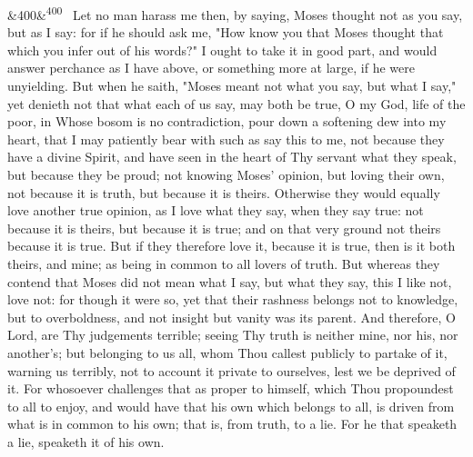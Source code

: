 \documentclass[12pt]{article}
\newcommand{\para}[1][]{\par\noindent\ifx&#1&\else\textsuperscript{\footnotesize #1}~\fi}
\begin{document}
\para[400] Let no man harass me then, by saying, Moses thought not as you say, but as I say: for if he should ask me, "How know you that Moses thought that which you infer out of his words?" I ought to take it in good part, and would answer perchance as I have above, or something more at large, if he were unyielding. But when he saith, "Moses meant not what you say, but what I say," yet denieth not that what each of us say, may both be true, O my God, life of the poor, in Whose bosom is no contradiction, pour down a softening dew into my heart, that I may patiently bear with such as say this to me, not because they have a divine Spirit, and have seen in the heart of Thy servant what they speak, but because they be proud; not knowing Moses' opinion, but loving their own, not because it is truth, but because it is theirs. Otherwise they would equally love another true opinion, as I love what they say, when they say true: not because it is theirs, but because it is true; and on that very ground not theirs because it is true. But if they therefore love it, because it is true, then is it both theirs, and mine; as being in common to all lovers of truth. But whereas they contend that Moses did not mean what I say, but what they say, this I like not, love not: for though it were so, yet that their rashness belongs not to knowledge, but to overboldness, and not insight but vanity was its parent. And therefore, O Lord, are Thy judgements terrible; seeing Thy truth is neither mine, nor his, nor another's; but belonging to us all, whom Thou callest publicly to partake of it, warning us terribly, not to account it private to ourselves, lest we be deprived of it. For whosoever challenges that as proper to himself, which Thou propoundest to all to enjoy, and would have that his own which belongs to all, is driven from what is in common to his own; that is, from truth, to a lie. For he that speaketh a lie, speaketh it of his own.
\end{document}
